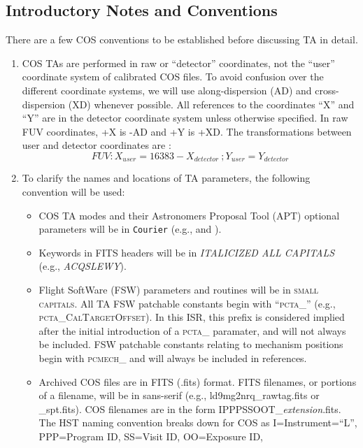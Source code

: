 \subsection{Introductory Notes and Conventions}
\vspace{-0.3cm}
There are a few COS conventions to be established before discussing TA in detail.
\begin{enumerate}
	\item{COS TAs are performed in raw or ``detector'' coordinates, not the ``user'' coordinate system of calibrated
		COS files. To avoid confusion over the different coordinate systems, we will use along-dispersion (AD) and cross-dispersion
		(XD) whenever possible.
		All references to the coordinates ``X'' and ``Y'' are in the detector coordinate system unless otherwise
		specified.
		In raw FUV coordinates, +X is -AD and +Y is +XD.
		The transformations between user and detector coordinates are :
		\begin{equation} FUV: X_{user} = 16383 - X_{detector} \ ; Y_{user} = Y_{detector} \end{equation}
		}
	\item{To clarify the names and locations of TA parameters, the following convention will be used:
		\begin{itemize}
			\item{COS TA modes and their Astronomers Proposal Tool (APT) optional parameters will be in \texttt{Courier} (e.g.,  and \numpos).
			}
			\item{Keywords in FITS headers will be in \textit{ITALICIZED ALL CAPITALS} (e.g., \textit{ACQSLEWY}).
			}
			\item{Flight SoftWare (FSW) parameters and routines will be in \textsc{small capitals}.
			All TA FSW patchable constants begin with ``\textsc{pcta\_}'' (e.g., \textsc{pcta\_CalTargetOffset}).
			In this ISR, this prefix is considered implied after the initial introduction of a \textsc{pcta\_} paramater, and will not always be included.
			FSW patchable constants relating to mechanism positions begin with \textsc{pcmech\_} and will always be included in references.
			}
			\item{Archived COS files are in FITS (.fits) format. FITS filenames, or portions of a filename, will be in {\sf sans-serif} (e.g., {\sf ld9mg2nrq\_rawtag.fits} or {\sf \_spt.fits}).
			COS filenames are in the form {\sf IPPPSSOOT\_{\it extension}.fits}.
			The HST naming convention breaks down for COS as I=Instrument=``L'', PPP=Program ID, SS=Visit ID, OO=Exposure ID,
}
\end{itemize}}
\end{enumerate}
